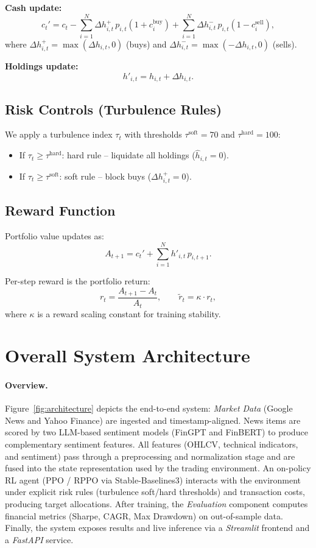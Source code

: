 \documentclass[12pt,a4paper]{report}
\begin{document}
\textbf{Cash update:}
\[
c_{t}' = c_t - \sum_{i=1}^N \Delta h^+_{i,t} \, p_{i,t} (1+c^{\text{buy}}_i)
+ \sum_{i=1}^N \Delta h^-_{i,t} \, p_{i,t} (1-c^{\text{sell}}_i),
\]
where \(\Delta h^+_{i,t} = \max(\Delta h_{i,t},0)\) (buys) and 
\(\Delta h^-_{i,t} = \max(-\Delta h_{i,t},0)\) (sells).

\textbf{Holdings update:} 
\[
h'_{i,t} = h_{i,t} + \Delta h_{i,t}.
\]

\subsection*{Risk Controls (Turbulence Rules)}
We apply a turbulence index \(\tau_t\) with thresholds 
\(\tau^{\text{soft}}=70\) and \(\tau^{\text{hard}}=100\):
\begin{itemize}
    \item If \(\tau_t \ge \tau^{\text{hard}}\): hard rule – liquidate all holdings (\(\hat{h}_{i,t}=0\)).
    \item If \(\tau_t \ge \tau^{\text{soft}}\): soft rule – block buys (\(\Delta h^+_{i,t}=0\)).
\end{itemize}

\subsection*{Reward Function}
Portfolio value updates as:
\[
A_{t+1} = c_t' + \sum_{i=1}^N h'_{i,t} \, p_{i,t+1}.
\]

Per-step reward is the portfolio return:
\[
r_t = \frac{A_{t+1} - A_t}{A_t}, \qquad
\tilde{r}_t = \kappa \cdot r_t,
\]
where \(\kappa\) is a reward scaling constant for training stability.



\section{Overall System Architecture}

\paragraph{Overview.}
Figure~\ref{fig:architecture} depicts the end-to-end system:
\emph{Market Data} (Google News and Yahoo Finance) are ingested and timestamp-aligned.
News items are scored by two LLM-based sentiment models (FinGPT and FinBERT) to produce complementary sentiment features.
All features (OHLCV, technical indicators, and sentiment) pass through a preprocessing and normalization stage and are fused into the state representation used by the trading environment.
An on-policy RL agent (PPO / RPPO via Stable-Baselines3) interacts with the environment under explicit risk rules (turbulence soft/hard thresholds) and transaction costs, producing target allocations.
After training, the \emph{Evaluation} component computes financial metrics (Sharpe, CAGR, Max Drawdown) on out-of-sample data.
Finally, the system exposes results and live inference via a \emph{Streamlit} frontend and a \emph{FastAPI} service.
\end{document}
